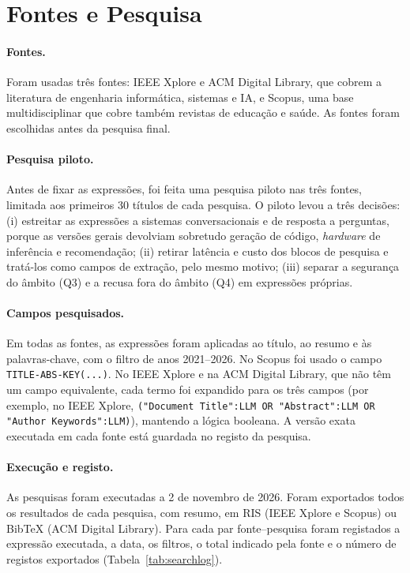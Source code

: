 \section{Fontes e Pesquisa}
\label{sec:app_search}

\paragraph{Fontes.} Foram usadas três fontes: IEEE Xplore e ACM Digital Library, que cobrem a literatura de engenharia informática, sistemas e \gls{IA}, e Scopus, uma base multidisciplinar que cobre também revistas de educação e saúde. As fontes foram escolhidas antes da pesquisa final. %

\paragraph{Pesquisa piloto.} Antes de fixar as expressões, foi feita uma pesquisa piloto nas três fontes, limitada aos primeiros 30 títulos de cada pesquisa. O piloto levou a três decisões: (i) estreitar as expressões a sistemas conversacionais e de resposta a perguntas, porque as versões gerais devolviam sobretudo geração de código, \emph{hardware} de inferência e recomendação; (ii) retirar latência e custo dos blocos de pesquisa e tratá-los como campos de extração, pelo mesmo motivo; (iii) separar a segurança do âmbito (Q3) e a recusa fora do âmbito (Q4) em expressões próprias.

\paragraph{Campos pesquisados.} Em todas as fontes, as expressões foram aplicadas ao título, ao resumo e às palavras-chave, com o filtro de anos 2021--2026. No Scopus foi usado o campo \texttt{TITLE-ABS-KEY(...)}. No IEEE Xplore e na ACM Digital Library, que não têm um campo equivalente, cada termo foi expandido para os três campos (por exemplo, no IEEE Xplore, \texttt{("Document Title":LLM OR "Abstract":LLM OR "Author Keywords":LLM)}), mantendo a lógica booleana. A versão exata executada em cada fonte está guardada no registo da pesquisa.

\paragraph{Execução e registo.} As pesquisas foram executadas a 2 de novembro de 2026. Foram exportados todos os resultados de cada pesquisa, com resumo, em RIS (IEEE Xplore e Scopus) ou BibTeX (ACM Digital Library). Para cada par fonte--pesquisa foram registados a expressão executada, a data, os filtros, o total indicado pela fonte e o número de registos exportados (Tabela~\ref{tab:searchlog}).

